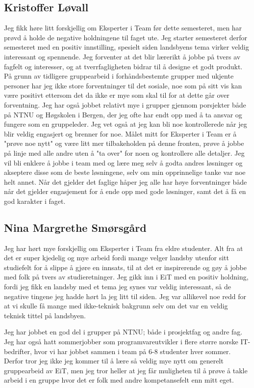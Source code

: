 \subsection*{Kristoffer Løvall}
Jeg fikk høre litt forskjellig om Eksperter i Team før dette semesteret, men har 
prøvd å holde de negative holdningene til faget ute. Jeg starter semesteret 
derfor semesteret med en positiv innstilling, spesielt siden landsbyens tema 
virker veldig interessant og spennende. Jeg forventer at det blir lærerikt å 
jobbe på tvers av fagfelt og interesser, og at tverrfagligheten bidrar til å 
designe et godt produkt. På grunn av tidligere gruppearbeid i forhåndsbestemte 
grupper med ukjente personer har jeg ikke store forventninger til det sosiale, 
noe som på sitt vis kan være positivt ettersom det da ikke er mye som skal til 
for at dette går over forventning. Jeg har også jobbet relativt mye i grupper 
gjennom porsjekter både på NTNU og Høgskolen i Bergen, der jeg ofte har endt opp 
med å ta ansvar og fungere som en gruppeleder. Jeg vet også at jeg kan bli noe 
kontrollerede når jeg blir veldig engasjert og brenner for noe.  Målet mitt for 
Eksperter i Team er å "prøve noe nytt" og være litt mer tilbakeholden på denne 
fronten, prøve å jobbe på linje med alle andre uten å "ta over" for noen og 
kontrollere alle detaljer. Jeg vil bli enklere å jobbe i team med og lære meg 
selv å godta andres løsninger og akseptere disse som de beste løsningene, selv om 
min opprinnelige tanke var noe helt annet. Når det gjelder det faglige håper jeg 
alle har høye forventninger både når det gjelder engasjement for å ende opp med 
gode løsninger, samt det å få en god karakter i faget.

\subsection*{Nina Margrethe Smørsgård}
Jeg har hørt mye forskjellig om Eksperter i Team fra eldre studenter. Alt fra 
at det er super kjedelig og mye arbeid fordi mange velger landsby utenfor sitt 
studiefelt for å slippe å gjøre en innsats, til at det er inspirerende og gøy 
å jobbe med folk på tvers av studieretninger. Jeg gikk inn i EiT med en positiv 
holdning, fordi jeg fikk en landsby med et tema jeg synes var veldig 
interessant, så de negative tingene jeg hadde hørt la jeg litt til siden. Jeg 
var allikevel noe redd for at vi skulle få mange med ikke-teknisk bakgrunn selv 
om det var en veldig teknisk tittel på landsbyen.

Jeg har jobbet en god del i grupper på NTNU; både i prosjektfag og andre fag.
Jeg har også hatt sommerjobber som programvareutvikler i flere større norske IT-
bedrifter, hvor vi har jobbet sammen i team på 6-8 studenter hver sommer. 
Derfor tror jeg ikke jeg kommer til å lære så veldig mye nytt om generelt 
gruppearbeid av EiT, men jeg tror heller at jeg får muligheten til å prøve å 
takle arbeid i en gruppe hvor det er folk med andre kompetansefelt enn mitt eget.

